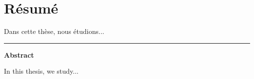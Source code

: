 \chapter*{Résumé}

\begin{otherlanguage}{french}
  Dans cette thèse, nous étudions...
\end{otherlanguage}
\clearpage

\flushright
\bigskip
\hrule \bigskip \bigskip
{\Huge \textbf{\textsf{Abstract}}}
\flushleftright
{}
\vspace{1.5cm}

In this thesis, we study...
